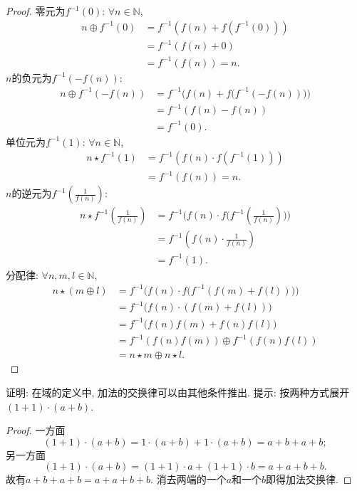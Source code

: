 \begin{proof}
    零元为$f^{-1}(0)$: $\forall n \in \mathbb{N}$,
    \[
    \begin{aligned}
        n \oplus f^{-1}(0) &= f^{-1}(f(n) + f(f^{-1}(0)))\\
        &= f^{-1}(f(n) + 0)\\
        &= f^{-1}(f(n)) = n.
    \end{aligned}
    \]
    $n$的负元为$f^{-1}(-f(n))$:
    \[
    \begin{aligned}
        n \oplus f^{-1}(-f(n)) &= f^{-1}\biggl(f(n) + f\bigl(f^{-1}(-f(n))\bigr)\biggr)\\
        &= f^{-1}(f(n) - f(n))\\
        &= f^{-1}(0).
    \end{aligned}
    \]
    单位元为$f^{-1}(1)$: $\forall n \in \mathbb{N}$,
    \[
    \begin{aligned}
        n \star f^{-1}(1) &= f^{-1}(f(n) \cdot f(f^{-1}(1)))\\
        &= f^{-1}(f(n)) = n.
    \end{aligned}
    \]
    $n$的逆元为$f^{-1}(\frac1{f(n)})$:
    \[
    \begin{aligned}
        n \star f^{-1}(\frac{1}{f(n)}) &= f^{-1}\biggl(f(n) \cdot f\bigl(f^{-1}(\frac{1}{f(n)})\bigr)\biggr)\\
        &= f^{-1}(f(n) \cdot \frac{1}{f(n)})\\
        &= f^{-1}(1).
    \end{aligned}
    \]
    分配律: $\forall n, m, l \in \mathbb{N}$,
    \[
    \begin{aligned}
        n \star (m \oplus l) &= f^{-1}\biggl(f(n) \cdot f\bigl(f^{-1}(f(m) + f(l))\bigr)\biggr)\\
        &= f^{-1}\bigl(f(n) \cdot (f(m) + f(l))\bigr)\\
        &= f^{-1}\bigl(f(n)f(m) + f(n)f(l)\bigr)\\
        &= f^{-1}(f(n)f(m)) \oplus f^{-1}(f(n)f(l))\\
        &= n \star m \oplus n \star l.
    \end{aligned}
    \]
\end{proof}

\begin{problem}\label{ex:1.1.5}
    证明: 在域的定义中, 加法的交换律可以由其他条件推出. 提示: 按两种方式展开$(1 + 1) \cdot (a + b)$.
\end{problem}

\begin{proof}
    一方面
    \[
        (1 + 1) \cdot (a + b) = 1 \cdot (a + b) + 1 \cdot (a + b) = a + b + a + b;
    \]
    另一方面
    \[
        (1 + 1) \cdot (a + b) = (1 + 1) \cdot a + (1 + 1) \cdot b = a + a + b + b.
    \]
    故有$a + b + a + b = a + a + b + b$. 消去两端的一个$a$和一个$b$即得加法交换律.
\end{proof}

